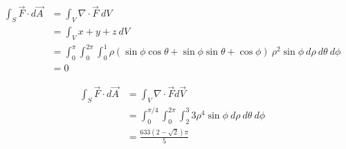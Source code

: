 \documentclass[8pt]{extarticle}
\begin{document}
\begin{description}[font=\normalfont]
\begin{align*}
        \int_{S}\vec{F} \cdot d\vec{A} &= \int_{V} \nabla \cdot \vec{F}~dV\\
                                       &= \int_{V} x+y+z~dV\\
                                       &= \int_{0}^{\pi}\int_{0}^{2\pi}\int_{0}^{1}\rho(\sin\phi\cos\theta + \sin\phi\sin\theta + \cos\phi)~\rho^2\sin\phi~d\rho~d\theta~d\phi\\
                                       &= 0
      \end{align*}
    \item[16:]
      \begin{align*}
        \int_{S}\vec{F} \cdot d\vec{A} &= \int_{V} \nabla \cdot \vec{F} d\vec{V}\\
                                       &= \int_{0}^{\pi/4}\int_{0}^{2\pi}\int_{2}^{3}3\rho^4\sin\phi~d\rho~d\theta~d\phi\\
                                       &= \frac{633(2-\sqrt{2})\pi}{5}
      \end{align*}
    \item[22:]
  \end{description}
\end{document}
